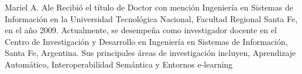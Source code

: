 \documentclass[journal]{IEEEtran}
\begin{document}

\vfill

\newpage

\begin{IEEEbiography}{Mariel A. Ale}
Recibió el título de Doctor con mención Ingeniería en Sistemas de Información en la Universidad Tecnológica Nacional, Facultad Regional Santa Fe, en el año 2009. Actualmente, se desempeña como investigador docente en el Centro de Investigación y Desarrollo en Ingeniería en Sistemas de Información, Santa Fe, Argentina. Sus principales áreas de investigación incluyen, Aprendizaje Automático, Interoperabilidad Semántica y Entornos e-learning
\end{IEEEbiography}






\end{document}
